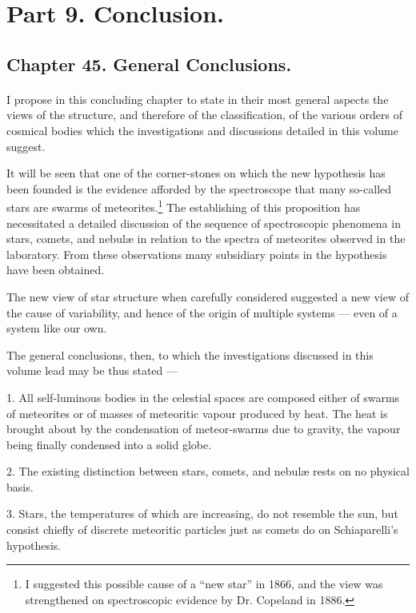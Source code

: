 \documentclass[a4paper, 12pt, oneside, polutonikogreek, english]{article}
\begin{document}
\section{Part 9. Conclusion.}
\subsection{Chapter 45. General Conclusions.}
\paragraph{}
I propose in this concluding chapter to state in their most general aspects the views of the structure, and therefore of the classification, of the various orders of cosmical bodies which the investigations and discussions detailed in this volume suggest.

It will be seen that one of the corner-stones on which the new hypothesis has been founded is the evidence afforded by the spectroscope that many so-called stars are swarms of meteorites.\footnote{I suggested this possible cause of a ``new star'' in 1866, and the view was strengthened on spectroscopic evidence by Dr. Copeland in 1886.} The establishing of this proposition has necessitated a detailed discussion of the sequence of spectroscopic phenomena in stars, comets, and nebulæ in relation to the spectra of meteorites observed in the laboratory. From these observations many subsidiary points in the hypothesis have been obtained.

The new view of star structure when carefully considered suggested a new view of the cause of variability, and hence of the origin of multiple systems --- even of a system like our own.

The general conclusions, then, to which the investigations discussed in this volume lead may be thus stated ---

1. All self-luminous bodies in the celestial spaces are composed either of swarms of meteorites or of masses of meteoritic vapour produced by heat. The heat is brought about by the condensation of meteor-swarms due to gravity, the vapour being finally condensed into a solid globe.

2. The existing distinction between stars, comets, and nebulæ rests on no physical basis.

3. Stars, the temperatures of which are increasing, do not resemble the sun, but consist chiefly of discrete meteoritic particles just as comets do on Schiaparelli's hypothesis.
\end{document}
